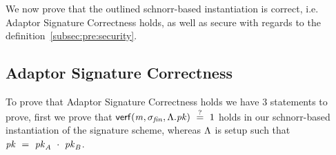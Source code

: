 We now prove that the outlined schnorr-based instantiation is correct, i.e. Adaptor Signature Correctness holds, as well as secure with regards to the definition~\ref{subsec:pre:security}.

\subsection{Adaptor Signature Correctness}\label{subsec:sig:aptsig-correctness}

To prove that Adaptor Signature Correctness holds we have 3 statements to prove, first we prove that $\mathsf{verf}(\mathit{m}, \sigma_{\mathit{fin}}, \Lambda.\mathit{pk}) ~\stackrel{?}{=}~ 1$ holds in our
schnorr-based instantiation of the signature scheme, whereas $\Lambda$ is setup such that $\mathit{pk} ~=~ \mathit{pk}_{\mathit{A}} ~\cdot~ \mathit{pk}_{\mathit{B}}$.

